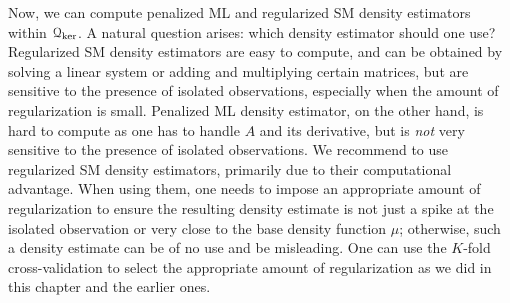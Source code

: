 Now, we can compute penalized ML and regularized SM density estimators within $\mathcal{Q}_{\ker}$. A natural question arises: which density estimator should one use? Regularized SM density estimators are easy to compute, and can be obtained by solving a linear system or adding and multiplying certain matrices, but are sensitive to the presence of isolated observations, especially when the amount of regularization is small. Penalized ML density estimator, on the other hand, is hard to compute as one has to handle $A$ and its derivative, but is \textit{not} very sensitive to the presence of isolated observations. We recommend to use regularized SM density estimators, primarily due to their computational advantage. When using them, one needs to impose an appropriate amount of regularization to ensure the resulting density estimate is not just a spike at the isolated observation or very close to the base density function $\mu$; otherwise, such a density estimate can be of no use and be misleading. One can use the $K$-fold cross-validation to select the appropriate amount of regularization as we did in this chapter and the earlier ones. %
